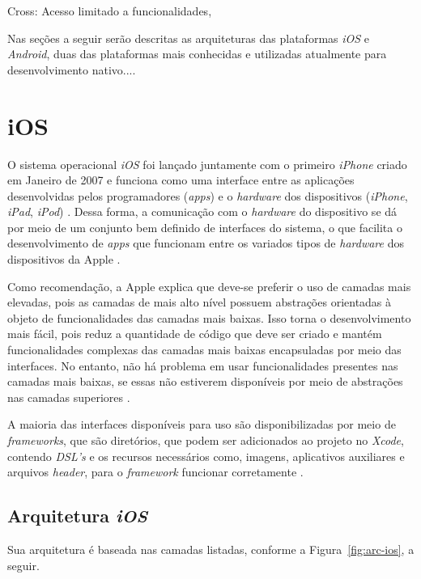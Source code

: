 Cross: Acesso limitado a funcionalidades, 


Nas seções a seguir serão descritas as arquiteturas das plataformas \textit{iOS} e \textit{Android}, duas das plataformas mais conhecidas e utilizadas atualmente para desenvolvimento nativo....

\section{iOS} \label{sec:ios}

O sistema operacional \textit{iOS} foi lançado juntamente com o primeiro \textit{iPhone} criado em Janeiro de 2007 e 
funciona como uma interface entre as aplicações desenvolvidas pelos programadores (\textit{apps}) e o \textit{hardware} 
dos dispositivos (\textit{iPhone}, \textit{iPad}, \textit{iPod}) \cite{apple_inc_apple_2007}. 
Dessa forma, a comunicação com o \textit{hardware} do dispositivo se dá 
por meio de um conjunto bem definido de interfaces do sistema, o que facilita o desenvolvimento de \textit{apps} 
que funcionam entre os variados tipos de \textit{hardware} dos dispositivos da Apple \cite{apple_inc_developing_2016}. 

Como recomendação, a Apple explica que deve-se preferir o uso de camadas mais elevadas, pois as camadas de 
mais alto nível possuem abstrações orientadas à objeto de funcionalidades das camadas mais baixas. Isso 
torna o desenvolvimento mais fácil, pois reduz a quantidade de código que deve ser criado e mantém funcionalidades 
complexas das camadas mais baixas encapsuladas por meio das interfaces. No entanto, não há problema em usar 
funcionalidades presentes nas camadas mais baixas, se essas não estiverem disponíveis por meio de abstrações nas 
camadas superiores \cite{apple_inc_tech_2014}. 

A maioria das interfaces disponíveis para uso são disponibilizadas por meio de \textit{frameworks}, 
que são diretórios, que podem ser adicionados ao projeto no \textit{Xcode}, contendo \textit{DSL's} e os recursos necessários como, 
imagens, aplicativos auxiliares e arquivos \textit{header}, para o \textit{framework} funcionar corretamente \cite{apple_inc_tech_2014}.

\subsection{Arquitetura \textit{iOS}} \label{arc-ios-section}
Sua arquitetura é baseada nas camadas listadas, conforme a Figura~\ref{fig:arc-ios}, a seguir.
 
